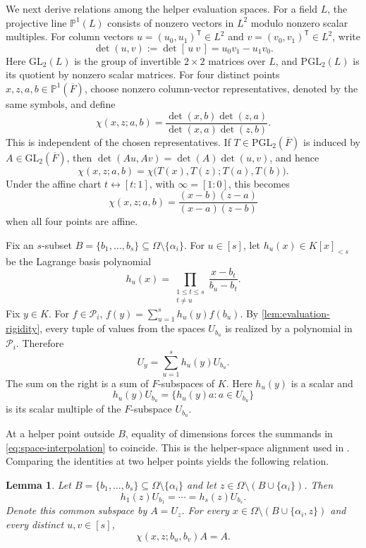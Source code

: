 \documentclass[11pt,onecolumn]{IEEEtran}
\newtheorem{lemma}{Lemma}
\newcommand{\Pone}{\mathbb P^1}
\begin{document}
We next derive relations among the helper evaluation spaces.
For a field $L$, the projective line $\Pone(L)$ consists of nonzero
vectors in $L^2$ modulo nonzero scalar multiples. For column vectors
$u=(u_0,u_1)^{\mathsf T}\in L^2$ and $v=(v_0,v_1)^{\mathsf T}\in L^2$, write
\[
\det(u,v):=\det[\,u\ v\,]=u_0v_1-u_1v_0.
\]
Here $\mathrm{GL}_2(L)$ is the group of invertible $2\times2$ matrices
over $L$, and $\mathrm{PGL}_2(L)$ is its quotient by nonzero scalar matrices.
For four
distinct points $x,z,a,b\in\Pone(\overline F)$, choose nonzero
column-vector representatives, denoted by the same symbols, and define
\[
\chi(x,z;a,b)
=
\frac{\det(x,b)\det(z,a)}
     {\det(x,a)\det(z,b)}.
\]
This is independent of the chosen representatives.  If
$T\in\mathrm{PGL}_2(\overline F)$ is induced by
$A\in\mathrm{GL}_2(\overline F)$, then
$\det(Au,Av)=\det(A)\det(u,v)$, and hence
\[
\chi(x,z;a,b)
=
\chi\bigl(T(x),T(z);T(a),T(b)\bigr).
\]
Under the affine chart $t\leftrightarrow[t:1]$, with
$\infty=[1:0]$, this becomes
\[
\chi(x,z;a,b)
=
\frac{(x-b)(z-a)}{(x-a)(z-b)}
\]
when all four points are affine.

Fix an $s$-subset
$B=\{b_1,\ldots,b_s\}\subseteq\Omega\setminus\{\alpha_i\}$.
For $u\in[s]$, let $h_u(x)\in K[x]_{<s}$ be the Lagrange basis polynomial
\[
h_u(x)
=
\prod_{\substack{1\le t\le s\\ t\ne u}}
\frac{x-b_t}{b_u-b_t}.
\]
Fix $y\in K$. For $f\in\mathcal P_i$,
$f(y)=\sum_{u=1}^sh_u(y)f(b_u)$. By
\cref{lem:evaluation-rigidity}, every tuple of values from the
spaces $U_{b_u}$ is realized by a polynomial in
$\mathcal P_i$. Therefore
\begin{equation}
U_y=\sum_{u=1}^sh_u(y)U_{b_u}.
\label{eq:space-interpolation}
\end{equation}
The sum on the right is a sum of $F$-subspaces of $K$.
Here $h_u(y)$ is a scalar and
\[
h_u(y)U_{b_u}=\{h_u(y)a:a\in U_{b_u}\}
\]
is its scalar multiple of the $F$-subspace $U_{b_u}$.

At a helper point outside $B$, equality of dimensions forces
the summands in \eqref{eq:space-interpolation} to coincide.
This is the helper-space alignment used in
\cite[proof of Theorem~5]{TYB2017}. Comparing the identities at
two helper points yields the following relation.

\begin{lemma}
\label{lem:helper-alignment}
Let $B=\{b_1,\ldots,b_s\}\subseteq\Omega\setminus\{\alpha_i\}$ and let
$z\in\Omega\setminus(B\cup\{\alpha_i\})$. Then
\[
h_1(z)U_{b_1}=\cdots=h_s(z)U_{b_s}.
\]
Denote this common subspace by $A=U_z$. For every
$x\in\Omega\setminus(B\cup\{\alpha_i,z\})$ and every distinct
$u,v\in[s]$,
\begin{equation}
\chi(x,z;b_u,b_v)A=A.
\label{eq:alignment-cr}
\end{equation}
\end{lemma}
\end{document}
